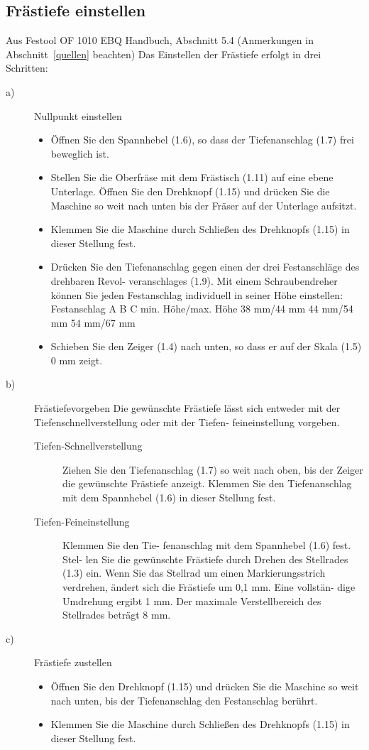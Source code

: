 \documentclass{\basedir/fablab-document}
\begin{document}
\subsection{Frästiefe einstellen}
\begin{leftbar}{Aus Festool OF 1010 EBQ Handbuch, Abschnitt 5.4 (Anmerkungen in Abschnitt~\ref{quellen} beachten)}
Das Einstellen der Frästiefe erfolgt in drei Schritten:
\begin{description}
\item[a)] Nullpunkt einstellen
\begin{itemize}
    \item Öffnen Sie den Spannhebel (1.6), so dass der Tiefenanschlag (1.7) frei beweglich ist.
    \item Stellen Sie die Oberfräse mit dem Frästisch (1.11) auf eine ebene Unterlage. Öffnen Sie den Drehknopf (1.15) und drücken Sie die Maschine so weit nach unten bis der Fräser auf der Unterlage aufsitzt.
    \item Klemmen Sie die Maschine durch Schließen des Drehknopfs (1.15) in dieser Stellung fest.
    \item Drücken Sie den Tiefenanschlag gegen einen der drei Festanschläge des drehbaren Revol- veranschlages (1.9).
Mit einem Schraubendreher können Sie jeden Festanschlag individuell in seiner Höhe einstellen:
Festanschlag
A B C
min. Höhe/max. Höhe
38 mm/44 mm 44 mm/54 mm 54 mm/67 mm
    \item Schieben Sie den Zeiger (1.4) nach unten, so dass er auf der Skala (1.5) 0 mm zeigt.
\end{itemize}
\item[b)] Frästiefevorgeben
Die gewünschte Frästiefe lässt sich entweder mit der Tiefenschnellverstellung oder mit der Tiefen- feineinstellung vorgeben.
\begin{description}
    \item[Tiefen-Schnellverstellung] Ziehen Sie den Tiefenanschlag (1.7) so weit nach oben, bis der Zeiger die gewünschte Frästiefe anzeigt. Klemmen Sie den Tiefenanschlag mit dem Spannhebel (1.6) in dieser Stellung fest.
     \item[Tiefen-Feineinstellung] Klemmen Sie den Tie- fenanschlag mit dem Spannhebel (1.6) fest. Stel- len Sie die gewünschte Frästiefe durch Drehen des Stellrades (1.3) ein. Wenn Sie das Stellrad um einen Markierungsstrich verdrehen, ändert sich die Frästiefe um 0,1 mm. Eine vollstän- dige Umdrehung ergibt 1 mm. Der maximale Verstellbereich des Stellrades beträgt 8 mm.
\end{description}
\item[c)] Frästiefe zustellen
\begin{itemize}
    \item Öffnen Sie den Drehknopf (1.15) und drücken Sie die Maschine so weit nach unten, bis der Tiefenanschlag den Festanschlag berührt.
    \item Klemmen Sie die Maschine durch Schließen des Drehknopfs (1.15) in dieser Stellung fest.
\end{itemize}
\end{description}
\end{leftbar}
\end{document}
